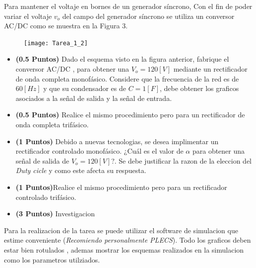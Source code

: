 \documentclass[
  11pt,
  letterpaper,
   addpoints,
   answers
  ]{exam}
\begin{document}
\begin{questions}
    \question Para mantener el voltaje en bornes de un generador síncrono, Con el fin de poder variar el voltaje $v_{o}$ del
    campo del generador síncrono se utiliza un conversor AC/DC como se muestra en la Figura 3.
    \begin{figure}[h!]
        \centering
        \texttt{[image: Tarea\_1\_2]}
    \end{figure}
    \begin{itemize}
        \item \textbf{(0.5 Puntos)} Dado el esquema visto en la figura anterior, fabrique el conversor AC/DC , para obtener una $V_{o}= 120[V]$ mediante un rectificador de onda completa monofásico. Considere que la frecuencia de la red es de $60[Hz]$ y que su condensador es de $C=1[F]$, debe obtener los graficos asociados a la señal de salida y la señal de entrada.
        \item \textbf{(0.5 Puntos)} Realice el mismo procedimiento pero para un rectificador de onda completa trifásico.
        \item \textbf{(1 Puntos)} Debido a nuevas tecnologias, se desea implimentar un rectificador controlado monofásico. ¿Cuál es el valor de $\alpha$ para obtener una señal de salida de $V_{o}= 120[V]$?. Se debe justificar la razon de la eleccion del \textit{Duty cicle} y como este afecta su respuesta.
        \item \textbf{(1 Puntos)}Realice el mismo procedimiento pero para un rectificador controlado trifásico.
        \item \textbf{(3 Puntos)} Investigacion
    \end{itemize}
\end{questions}
Para la realizacion de la tarea se puede utilizar el software de simulacion que estime conveniente (\textit{Recomiendo personalmente PLECS}). Todo los graficos deben estar bien rotulados , ademas mostrar los esquemas realizados en la simulacion como los parametros utilziados.
\end{document}
